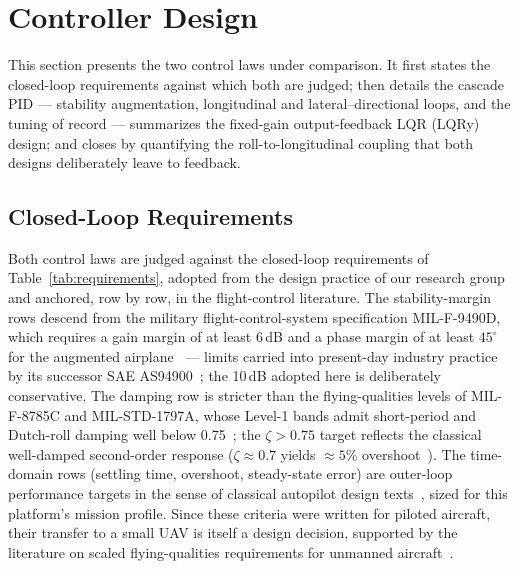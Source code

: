 \section{Controller Design}
\label{sec:control}
This section presents the two control laws under comparison. It first
states the closed-loop requirements against which both are judged;
then details the cascade PID --- stability augmentation, longitudinal
and lateral--directional loops, and the tuning of record ---
summarizes the fixed-gain output-feedback LQR (LQRy) design; and
closes by quantifying the roll-to-longitudinal coupling that both
designs deliberately leave to feedback.

\subsection{Closed-Loop Requirements}
\label{sec:requirements}
Both control laws are judged against the closed-loop requirements of
Table~\ref{tab:requirements}, adopted from the design practice of our
research group~\cite{mirko2026companion} and anchored, row by row, in
the flight-control literature. The stability-margin rows descend from the military
flight-control-system specification MIL-F-9490D, which requires a gain
margin of at least 6\,dB and a phase margin of at least $45^\circ$ for
the augmented airplane~\cite{milf9490d1975} --- limits carried into
present-day industry practice by its successor SAE
AS94900~\cite{sae2007as94900}; the 10\,dB adopted here is deliberately
conservative. The damping row is stricter than the flying-qualities
levels of MIL-F-8785C and MIL-STD-1797A, whose Level-1 bands admit
short-period and Dutch-roll damping well below
0.75~\cite{milf8785c1980,moorhouse1982milf8785c,milstd1797a1990}; the
$\zeta>0.75$ target reflects the classical well-damped second-order
response ($\zeta\approx0.7$ yields ${\approx}5\%$
overshoot~\cite{franklin2018feedback}). The time-domain rows
(settling time, overshoot, steady-state error) are outer-loop
performance targets in the sense of classical autopilot design
texts~\cite{blakelock1991automatic,nelson1998flight}, sized for this
platform's mission profile. Since these criteria were written for
piloted aircraft, their transfer to a small UAV is itself a design
decision, supported by the literature on scaled flying-qualities
requirements for unmanned aircraft~\cite{cotting2010evolution}.

